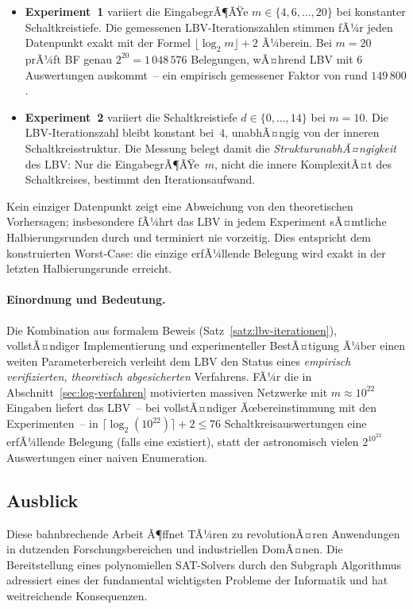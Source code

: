 ﻿\documentclass[a4paper,12pt]{article}
\theoremstyle{definition}
\begin{document}
\begin{itemize}
  \item \textbf{Experiment~1} variiert die EingabegrÃ¶ÃŸe $m \in \{4,6,\ldots,20\}$ bei
    konstanter Schaltkreistiefe.  Die gemessenen LBV-Iterationszahlen stimmen fÃ¼r
    jeden Datenpunkt exakt mit der Formel $\lfloor\log_2 m\rfloor + 2$ Ã¼berein.
    Bei $m = 20$ prÃ¼ft BF genau $2^{20} = 1\,048\,576$ Belegungen, wÃ¤hrend LBV
    mit $6$ Auswertungen auskommt~-- ein empirisch gemessener Faktor von rund
    $149\,800$.

  \item \textbf{Experiment~2} variiert die Schaltkreistiefe $d \in \{0,\ldots,14\}$
    bei $m = 10$.  Die LBV-Iterationszahl bleibt konstant bei~$4$, unabhÃ¤ngig
    von der inneren Schaltkreisstruktur.  Die Messung belegt damit die
    \emph{StrukturunabhÃ¤ngigkeit} des LBV: Nur die EingabegrÃ¶ÃŸe~$m$, nicht
    die innere KomplexitÃ¤t des Schaltkreises, bestimmt den Iterationsaufwand.
\end{itemize}

Kein einziger Datenpunkt zeigt eine Abweichung von den theoretischen Vorhersagen;
insbesondere fÃ¼hrt das LBV in jedem Experiment sÃ¤mtliche Halbierungsrunden durch
und terminiert nie vorzeitig.  Dies entspricht dem konstruierten Worst-Case:
die einzige erfÃ¼llende Belegung wird exakt in der letzten Halbierungsrunde erreicht.

\paragraph{Einordnung und Bedeutung.}
Die Kombination aus formalem Beweis (Satz~\ref{satz:lbv-iterationen}), vollstÃ¤n\-diger
Implementierung und experimenteller BestÃ¤tigung Ã¼ber einen weiten Parameterbereich
verleiht dem LBV den Status eines \emph{empirisch verifizierten, theoretisch
abgesicherten} Verfahrens.  FÃ¼r die in Abschnitt~\ref{sec:log-verfahren}
motivierten massiven Netzwerke mit $m \approx 10^{22}$ Eingaben liefert das
LBV~-- bei vollstÃ¤ndiger Ãœbereinstimmung mit den Experimenten~-- in
$\lceil\log_2(10^{22})\rceil + 2 \leq 76$ Schaltkreisauswertungen eine
erfÃ¼llende Belegung (falls eine existiert), statt der astronomisch vielen
$2^{10^{22}}$ Auswertungen einer naiven Enumeration.

\subsection{Ausblick}

Diese bahnbrechende Arbeit Ã¶ffnet TÃ¼ren zu revolutionÃ¤ren Anwendungen in dutzenden Forschungsbereichen und industriellen DomÃ¤nen. Die Bereitstellung eines polynomiellen SAT-Solvers durch den Subgraph Algorithmus adressiert eines der fundamental wichtigsten Probleme der Informatik und hat weitreichende Konsequenzen.
\end{document}
